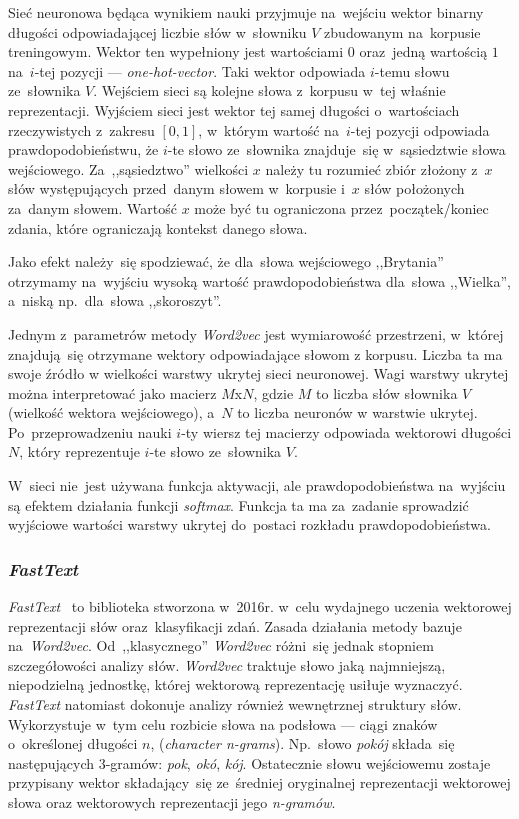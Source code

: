 \documentclass[pl]{minipw} %
\begin{document}
Sieć neuronowa będąca wynikiem nauki przyjmuje na~wejściu wektor binarny długości odpowiadającej liczbie słów w~słowniku $V$ zbudowanym na~korpusie treningowym. Wektor ten wypełniony jest wartościami $0$ oraz~jedną wartością $1$ na~$i$-tej pozycji --- \textit{one-hot-vector}. Taki wektor odpowiada $i$-temu słowu ze~słownika $V$. Wejściem sieci są kolejne słowa z~korpusu w~tej właśnie reprezentacji. Wyjściem sieci jest wektor tej samej długości o~wartościach rzeczywistych z~zakresu $[0,1]$, w~którym wartość na~$i$-tej pozycji odpowiada prawdopodobieństwu, że $i$-te słowo ze~słownika znajduje~się w~sąsiedztwie słowa wejściowego. Za~,,sąsiedztwo'' wielkości $x$ należy tu rozumieć zbiór złożony z~$x$ słów występujących przed~danym słowem w~korpusie i~$x$ słów położonych za~danym słowem. Wartość $x$ może być tu ograniczona przez~początek/koniec zdania, które ograniczają kontekst danego słowa.

Jako efekt należy~się spodziewać, że dla~słowa wejściowego ,,Brytania'' otrzymamy na~wyjściu wysoką wartość prawdopodobieństwa dla~słowa ,,Wielka'', a~niską np.~dla~słowa ,,skoroszyt''.

Jednym z~parametrów metody \textit{Word2vec} jest wymiarowość przestrzeni, w~której znajdują~się otrzymane wektory odpowiadające słowom z korpusu. Liczba ta ma swoje źródło w wielkości warstwy ukrytej sieci neuronowej. Wagi warstwy ukrytej można interpretować jako macierz $M$x$N$, gdzie $M$ to liczba słów słownika $V$ (wielkość wektora wejściowego), a~$N$ to liczba neuronów w warstwie ukrytej. Po~przeprowadzeniu nauki $i$-ty wiersz tej macierzy odpowiada wektorowi długości $N$, który reprezentuje $i$-te słowo ze~słownika $V$.

W~sieci nie~jest używana funkcja aktywacji, ale prawdopodobieństwa na~wyjściu są efektem działania funkcji \textit{softmax}. Funkcja ta ma za~zadanie sprowadzić wyjściowe wartości warstwy ukrytej do~postaci rozkładu prawdopodobieństwa. 


\subsubsection{\textit{FastText}}

\textit{FastText}~\cite{fasttext} to biblioteka stworzona w~2016r. w~celu wydajnego uczenia wektorowej reprezentacji słów oraz~klasyfikacji zdań. Zasada działania metody bazuje na~\textit{Word2vec}. Od~,,klasycznego'' \textit{Word2vec} różni~się jednak stopniem szczegółowości analizy słów. \textit{Word2vec} traktuje słowo jaką najmniejszą, niepodzielną jednostkę, której wektorową reprezentację usiłuje wyznaczyć. \textit{FastText} natomiast dokonuje analizy również wewnętrznej struktury słów. Wykorzystuje w~tym celu rozbicie słowa na podsłowa --- ciągi znaków o~określonej długości $n$, (\textit{character n-grams}). Np.~słowo \textit{pokój} składa~się następujących 3-gramów: \textit{pok}, \textit{okó}, \textit{kój}. Ostatecznie słowu wejściowemu zostaje przypisany wektor składający~się ze~średniej oryginalnej reprezentacji wektorowej słowa oraz wektorowych reprezentacji jego \textit{n-gramów}.
\end{document}
